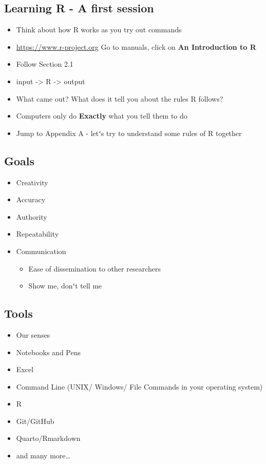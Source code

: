 \documentclass[
  letterpaper,
  DIV=11,
  numbers=noendperiod]{scrartcl}
\providecommand{\tightlist}{%
  \setlength{\itemsep}{0pt}\setlength{\parskip}{0pt}}\usepackage{longtable,booktabs,array}
\begin{document}
\hypertarget{learning-r---a-first-session}{%
\subsection{Learning R - A first
session}\label{learning-r---a-first-session}}

\begin{itemize}
\tightlist
\item
  Think about how R works as you try out commands
\item
  \url{https://www.r-project.org} Go to manuals, click on \textbf{An
  Introduction to R}
\item
  Follow Section 2.1
\item
  input -\textgreater{} R -\textgreater{} output
\item
  What came out? What does it tell you about the rules R follows?
\item
  Computers only do \textbf{Exactly} what you tell them to do
\item
  Jump to Appendix A - letʻs try to understand some rules of R together
\end{itemize}

\hypertarget{goals}{%
\subsection{Goals}\label{goals}}

\begin{itemize}
\tightlist
\item
  Creativity
\item
  Accuracy
\item
  Authority
\item
  Repeatability
\item
  Communication

  \begin{itemize}
  \tightlist
  \item
    Ease of dissemination to other researchers
  \item
    Show me, donʻt tell me
  \end{itemize}
\end{itemize}

\hypertarget{tools}{%
\subsection{Tools}\label{tools}}

\begin{itemize}
\tightlist
\item
  Our senses
\item
  Notebooks and Pens
\item
  Excel
\item
  Command Line (UNIX/ Windows/ File Commands in your operating system)
\item
  R
\item
  Git/GitHub
\item
  Quarto/Rmarkdown
\item
  and many more\ldots{}
\end{itemize}
\end{document}
